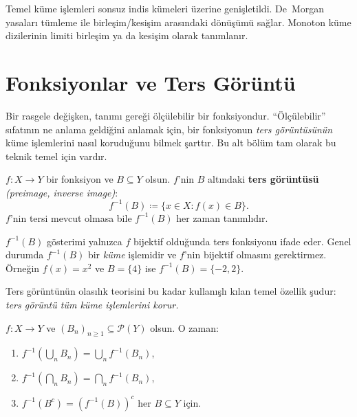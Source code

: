 \begin{mikroozet}[§0.1 özeti]
Temel küme işlemleri sonsuz indis kümeleri üzerine genişletildi.
De~Morgan yasaları tümleme ile birleşim/kesişim arasındaki dönüşümü sağlar.
Monoton küme dizilerinin limiti birleşim ya da kesişim olarak tanımlanır.
\end{mikroozet}


\section{Fonksiyonlar ve Ters Görüntü}

\begin{motivasyon}[§0.2]
Bir rasgele değişken, tanımı gereği ölçülebilir bir fonksiyondur.
``Ölçülebilir'' sıfatının ne anlama geldiğini anlamak için,
bir fonksiyonun \emph{ters görüntüsünün} küme işlemlerini nasıl
koruduğunu bilmek şarttır. Bu alt bölüm tam olarak bu teknik temel
için vardır.
\end{motivasyon}

\begin{tanim}\label{def:tergoriuntu}
$f: X \to Y$ bir fonksiyon ve $B \subseteq Y$ olsun.
$f$'nin $B$ altındaki \textbf{ters görüntüsü} \emph{(preimage, inverse image)}:
\[
  f^{-1}(B) \coloneqq \{x \in X : f(x) \in B\}.
\]
$f$'nin tersi mevcut olmasa bile $f^{-1}(B)$ her zaman tanımlıdır.
\end{tanim}

\begin{hataanalizi}
$f^{-1}(B)$ gösterimi yalnızca $f$ bijektif olduğunda
ters fonksiyonu ifade eder. Genel durumda $f^{-1}(B)$ bir
\emph{küme} işlemidir ve $f$'nin bijektif olmasını gerektirmez.
Örneğin $f(x) = x^2$ ve $B = \{4\}$ ise $f^{-1}(B) = \{-2, 2\}$.
\end{hataanalizi}

Ters görüntünün olasılık teorisini bu kadar kullanışlı kılan temel özellik
şudur: \emph{ters görüntü tüm küme işlemlerini korur.}

\begin{teorem}\label{thm:tergoriuntu}
$f: X \to Y$ ve $(B_n)_{n \geq 1} \subseteq \mathcal{P}(Y)$ olsun. O zaman:
\begin{enumerate}[label=(\roman*)]
  \item $f^{-1}\!\left(\bigcup_n B_n\right) = \bigcup_n f^{-1}(B_n)$,
  \item $f^{-1}\!\left(\bigcap_n B_n\right) = \bigcap_n f^{-1}(B_n)$,
  \item $f^{-1}(B^c) = \left(f^{-1}(B)\right)^c$ her $B \subseteq Y$ için.
\end{enumerate}
\end{teorem}

